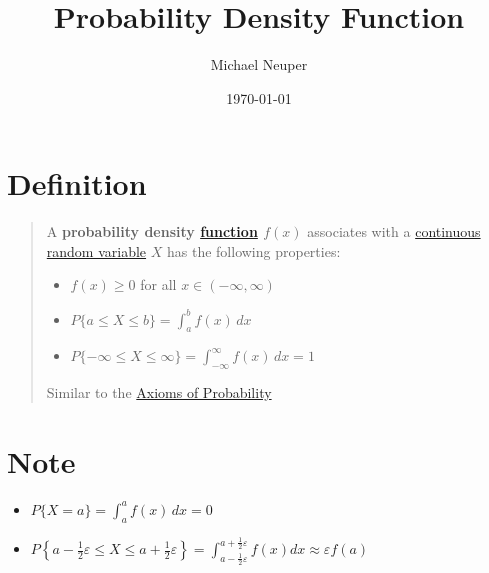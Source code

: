 \documentclass[11pt]{article}
\author{Michael Neuper}
\date{\today}
\title{Probability Density Function}
\begin{document}
\maketitle
\tableofcontents

\section{Definition}
\label{sec:org97f85ed}
\begin{quote}
A \textbf{probability density \href{../../../../Notes/20240301082717-functions.org}{function} \(f(x)\)} associates with a \href{20240430120241-continuous_random_variables.org}{continuous random variable} \(X\) has the following properties:
\begin{itemize}
\item \(f(x) \ge 0\) for all \(x\in(-\infty,\infty)\)
\item \(P\{a\le X \le b\} = \int_a^{b} f(x) \, dx\)
\item \(P\{-\infty\le X \le  \infty\} = \int_{-\infty}^{\infty} f(x) \, dx = 1\)
\end{itemize}

Similar to the \href{../../../../Notes/20240224174512-axioms_of_probability.org}{Axioms of Probability}
\end{quote}
\section{Note}
\label{sec:org8f7ce66}
\begin{itemize}
\item \(P\{X=a\} = \int_a^af(x) \, dx = 0\)
\item \(P\left\{a-\frac{1}{2} \varepsilon \leq X \leq a+\frac{1}{2} \varepsilon\right\}=\int_{a-\frac{1}{2} \varepsilon}^{a+\frac{1}{2} \varepsilon} f(x) d x \approx \varepsilon f(a)\)
\end{itemize}
\end{document}
